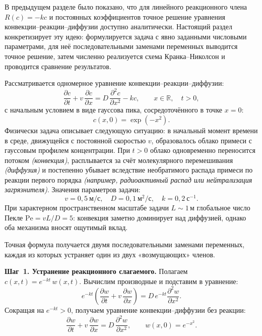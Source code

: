 
    В предыдущем разделе было показано, что для линейного реакционного члена
    $R(c) = -kc$ и постоянных коэффициентов точное решение уравнения
    конвекции--реакции--диффузии доступно аналитически.
    Настоящий раздел конкретизирует эту идею: формулируется задача с явно
    заданными числовыми параметрами, для неё последовательными заменами переменных
    выводится точное решение, затем численно реализуется схема Кранка--Николсон
    и проводится сравнение результатов.


        Рассматривается одномерное уравнение конвекции--реакции--диффузии:
        \[
            \frac{\partial c}{\partial t}
            + v\,\frac{\partial c}{\partial x}
            = D\,\frac{\partial^2 c}{\partial x^2} - k c,
            \qquad x \in \mathbb{R},\quad t > 0,
        \]
        с начальным условием в виде гауссова пика, сосредоточённого в точке $x = 0$:
        \[
            c(x, 0) = \exp\!\left(-x^2\right).
        \]
        Физически задача описывает следующую ситуацию: в начальный момент времени
        в среде, движущейся с постоянной скоростью $v$, образовалось облако примеси
        с гауссовым профилем концентрации.
        При $t > 0$ облако одновременно переносится потоком \textit{(конвекция)},
        расплывается за счёт молекулярного перемешивания \textit{(диффузия)}
        и постепенно убывает вследствие необратимого распада примеси по реакции первого
        порядка \textit{(например, радиоактивный распад или нейтрализация загрязнителя)}.
        Значения параметров задачи:
        \[
            v = 0{,}5 \ \text{м/с}, \quad
            D = 0{,}1 \ \text{м}^2\!/\text{с}, \quad
            k = 0{,}2 \ \text{с}^{-1}.
        \]
        При характерном пространственном масштабе задачи $L \sim 1$\,м глобальное
        число Пекле $\mathrm{Pe} = vL/D = 5$: конвекция заметно доминирует над
        диффузией, однако оба механизма вносят ощутимый вклад.


        Точная формула получается двумя последовательными заменами переменных,
        каждая из которых устраняет один из двух «возмущающих» членов.

        \textbf{Шаг~1. Устранение реакционного слагаемого.}
        Полагаем $c(x, t) = e^{-kt}\,w(x, t)$.
        Вычислим производные и подставим в уравнение:
        \[
            e^{-kt}\!\left(\frac{\partial w}{\partial t}
            + v\,\frac{\partial w}{\partial x}\right)
            = D\,e^{-kt}\frac{\partial^2 w}{\partial x^2}.
        \]
        Сокращая на $e^{-kt} > 0$, получаем уравнение конвекции--диффузии
        без реакции:
        \[
            \frac{\partial w}{\partial t}
            + v\,\frac{\partial w}{\partial x}
            = D\,\frac{\partial^2 w}{\partial x^2}, \qquad
            w(x, 0) = e^{-x^2}.
        \]

